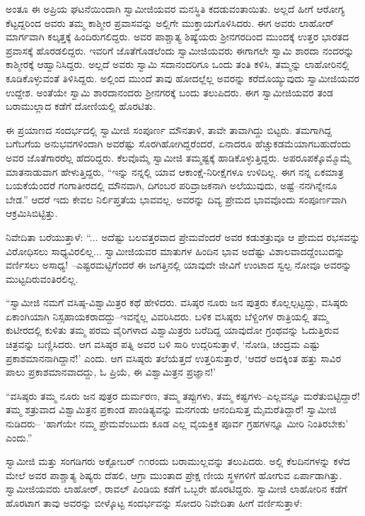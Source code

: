 ಅಂತೂ ಈ ಅಪ್ರಿಯ ಘಟನೆಯಿಂದಾಗಿ ಸ್ವಾಮೀಜಿಯವರ ಮನಸ್ಥಿತಿ ಕದಡುವಂತಾಯಿತು. ಅಲ್ಲದೆ ಹೀಗೆ ಆರೋಗ್ಯ ಕೆಟ್ಟದ್ದರಿಂದ ಅವರು ತಮ್ಮ ಕಾಶ್ಮೀರ ಪ್ರವಾಸವನ್ನು ಅಲ್ಲಿಗೇ ಮುಕ್ತಾಯಗೊಳಿಸಿದರು. ಈಗ ಅವರು ಲಾಹೋರ್ ಮಾರ್ಗವಾಗಿ ಕಲ್ಕತ್ತಕ್ಕೆ ಹಿಂದಿರುಗಲಿದ್ದರು. ಅವರ ಪಾಶ್ಚಾತ್ಯ ಶಿಷ್ಯೆಯರು ಶ್ರೀನಗರದಿಂದ ಮುಂದಕ್ಕೆ ಉತ್ತರ ಭಾರತದ ಪ್ರವಾಸಕ್ಕೆ ಹೊರಡಲಿದ್ದರು. ಇವರಿಗೆ ಜೊತೆಗೊಡಲೆಂದು ಸ್ವಾಮೀಜಿಯವರು ಈಗಾಗಲೇ ಸ್ವಾಮಿ ಶಾರದಾ ನಂದರನ್ನು ಕಾಶ್ಮೀರಕ್ಕೆ ಆಹ್ವಾನಿಸಿದ್ದರು. ಅಲ್ಲದೆ ಅವರು ಸ್ವಾಮಿ ಸದಾನಂದರಿಗೂ ಒಂದು ತಂತಿ ಕಳಿಸಿ, ತಮ್ಮನ್ನು ಲಾಹೋರಿನಲ್ಲಿ ಕೂಡಿಕೊಳ್ಳುವಂತೆ ತಿಳಿಸಿದ್ದರು. ಅಲ್ಲಿಂದ ಮುಂದೆ ತಾವು ಹೋದಲ್ಲೆಲ್ಲ ಅವರನ್ನು ಕರೆದೊಯ್ಯುವುದು ಸ್ವಾಮೀಜಿಯವರ ಉದ್ದೇಶ. ಅಂತೆಯೇ ಸ್ವಾಮಿ ಶಾರದಾನಂದರು ಶ್ರೀನಗರಕ್ಕೆ ಬಂದು ತಲುಪಿದರು. ಈಗ ಸ್ವಾಮೀಜಿಯವರ ತಂಡ ಬರಾಮುಲ್ಲಾದ ಕಡೆಗೆ ದೋಣಿಯಲ್ಲಿ ಹೊರಟಿತು.

ಈ ಪ್ರಯಾಣದ ಸಂದರ್ಭದಲ್ಲಿ ಸ್ವಾಮೀಜಿ ಸಂಪೂರ್ಣ ಮೌನತಾಳಿ, ತಾವೇ ತಾವಾಗಿದ್ದು ಬಿಟ್ಟರು. ತಮಗಾಗಿದ್ದ ಬಗೆಬಗೆಯ ಅನುಭವಗಳಿಂದಾಗಿ ಅವರೆಷ್ಟು ಸೊರಗಿಹೋಗಿದ್ದರೆಂದರೆ, ಏನಾದರೂ ಹೆಚ್ಚುಕಡಮೆಯಾಗಬಹುದೆಂದು ಅವರ ಜೊತೆಗಾರರೆಲ್ಲ ಹೆದರಿದ್ದರು. ಕೆಲವೊಮ್ಮೆ ಸ್ವಾಮೀಜಿ ತಮ್ಮಷ್ಟಕ್ಕೆ ಹಾಡಿಕೊಳ್ಳುತ್ತಿದ್ದರು. ಅಪರೂಪಕ್ಕೊಮ್ಮೊಮ್ಮೆ ಮಾತನಾಡುವಾಗ ಹೇಳುತ್ತಿದ್ದರು, “ಇನ್ನು ನನ್ನಲ್ಲಿ ಯಾವ ಆಕಾಂಕ್ಷೆ-ನಿರೀಕ್ಷೆಗಳೂ ಉಳಿದಿಲ್ಲ. ಈಗ ನನ್ನ ಏಕಮಾತ್ರ ಬಯಕೆಯೆಂದರೆ ಗಂಗಾತೀರದಲ್ಲಿ ಮೌನವಾಗಿ, ದಿಗಂಬರ ಪರಿವ್ರಾಜಕನಾಗಿ ಅಲೆಯುವುದು, ಅಷ್ಟೆ–ನನಗಿನ್ನೇನೂ ಬೇಡ.” ಆದರೆ ಇದು ಕೇವಲ ನಿರ್ಲಿಪ್ತತೆಯ ಭಾವವಲ್ಲ. ಅವರನ್ನು ದಿವ್ಯ ಪ್ರೇಮದ ಭಾವವೊಂದು ಸಂಪೂರ್ಣವಾಗಿ ಆಕ್ರಮಿಸಿಬಿಟ್ಟಿತ್ತು.

ನಿವೇದಿತಾ ಬರೆಯುತ್ತಾಳೆ: “... ಅದೆಷ್ಟು ಬಲವತ್ತರವಾದ ಪ್ರೇಮವೆಂದರೆ ಅವರ ಕಡುಶತ್ರುವೂ ಆ ಪ್ರೇಮದ ರಭಸವನ್ನು ವಿರೋಧಿಸಲು ಸಾಧ್ಯವಿರಲಿಲ್ಲ... ಸ್ವಾಮೀಜಿಯವರ ಮಾತುಗಳ ಹಿಂದಿನ ಭಾವ ಅದೆಷ್ಟು ವಿಶಾಲವಾದದ್ದೆಂಬುದನ್ನು ವರ್ಣಿಸಲು ಅಸಾಧ್ಯ! –ಎಷ್ಟರಮಟ್ಟಿಗೆಂದರೆ ಈ ಜಗತ್ತಿನಲ್ಲಿ ಯಾವುದೇ ಜೀವಿಗೆ ಉಂಟಾದ ಸ್ವಲ್ಪ ನೋವೂ ಅವರನ್ನು ಮುಟ್ಟದಿರುವಂತಿರಲಿಲ್ಲ.

“ಸ್ವಾಮೀಜಿ ನಮಗೆ ವಸಿಷ್ಠ-ವಿಶ್ವಾಮಿತ್ರರ ಕಥೆ ಹೇಳಿದರು. ವಸಿಷ್ಠರ ನೂರು ಜನ ಪುತ್ರರು ಕೊಲ್ಲಲ್ಪಟ್ಟದ್ದು, ವಸಿಷ್ಠರು ಏಕಾಂಗಿಯಾಗಿ ನಿಸ್ಸಹಾಯಕರಾದದ್ದು–ಇವನ್ನೆಲ್ಲ ವಿವರಿಸಿದರು. ಬಳಿಕ ವಸಿಷ್ಠರು ಬೆಳ್ದಿಂಗಳ ರಾತ್ರಿಯಲ್ಲಿ ತಮ್ಮ ಕುಟೀರದಲ್ಲಿ ಕುಳಿತು ತಮ್ಮ ಪರಮ ವೈರಿಗಳಾದ ವಿಶ್ವಾಮಿತ್ರರು ಬರೆದಿದ್ದ ಯಾವುದೋ ಗ್ರಂಥವನ್ನು ಓದುತ್ತಿರುವ ಚಿತ್ರವನ್ನು ಬಣ್ಣಿಸಿದರು. ಆಗ ವಸಿಷ್ಠರ ಪತ್ನಿ ಅವರ ಬಳಿ ಸಾರಿ ಉದ್ಗರಿಸುತ್ತಾಳೆ, ‘ನೋಡಿ, ಚಂದ್ರಮ ಎಷ್ಟು ಪ್ರಕಾಶಮಾನನಾಗಿದ್ದಾನೆ!’ ಎಂದು. ಆಗ ವಸಿಷ್ಠರು ತಲೆಯೆತ್ತದೆ ಉತ್ತರಿಸುತ್ತಾರೆ, ‘ಆದರೆ ಅದಕ್ಕಿಂತ ಹತ್ತು ಸಾವಿರ ಪಾಲು ಪ್ರಕಾಶಮಾನವಾದದ್ದು, ಓ ಪ್ರಿಯೆ, ಈ ವಿಶ್ವಾಮಿತ್ರನ ಪ್ರಜ್ಞಾನ!’

“ವಸಿಷ್ಠರು ತಮ್ಮ ನೂರು ಜನ ಪುತ್ರರ ದುರ್ಮರಣ, ತಮ್ಮ ತಪ್ಪುಗಳು, ತಮ್ಮ ಕಷ್ಟಗಳು–ಎಲ್ಲವನ್ನೂ ಮರೆತುಬಿಟ್ಟಿದ್ದಾರೆ! ತಮ್ಮ ಶತ್ರುವಾದ ವಿಶ್ವಾಮಿತ್ರನ ಪ್ರಕಾಂಡ ಪಾಂಡಿತ್ಯವನ್ನು ಮನಗಂಡು ಆನಂದಿಸುತ್ತ ಮೈಮರೆತಿದ್ದಾರೆ! ಸ್ವಾಮೀಜಿ ನುಡಿದರು– ‘ಹಾಗೆಯೇ ನಮ್ಮ ಪ್ರೇಮವೆಂಬುದು ಕೂಡ ಎಲ್ಲ ವೈಯಕ್ತಿಕ ಪೂರ್ವ ಗ್ರಹಗಳನ್ನೂ ಮೀರಿ ನಿಂತಿರಬೇಕು’ ಎಂದು.”

ಸ್ವಾಮೀಜಿ ಮತ್ತು ಸಂಗಡಿಗರು ಅಕ್ಟೋಬರ್ ೧೧ರಂದು ಬರಾಮುಲ್ಲವನ್ನು ತಲುಪಿದರು. ಅಲ್ಲಿ ಕೆಲದಿನಗಳನ್ನು ಕಳೆದ ಮೇಲೆ ಅವರ ಪಾಶ್ಚಾತ್ಯ ಶಿಷ್ಯರು ದೆಹಲಿ, ಆಗ್ರಾ ಮುಂತಾದ ಪ್ರೇಕ್ಷ ಣೀಯ ಸ್ಥಳಗಳಿಗೆ ಹೋಗುವ ಏರ್ಪಾಡಾಗಿತ್ತು. ಸ್ವಾಮೀಜಿಯವರು ಲಾಹೋರ್, ರಾವಲ್ ಪಿಂಡಿಯ ಕಡೆಗೆ ಒಬ್ಬರೇ ಹೊರಟಿದ್ದರು. ಸ್ವಾಮೀಜಿ ಲಾಹೋರಿನ ಕಡೆಗೆ ಹೊರಟಾಗ ತಾವು ಅವರನ್ನು ಬೀಳ್ಕೊಟ್ಟ ಸಂದರ್ಭವನ್ನು ಸೋದರಿ ನಿವೇದಿತಾ ಹೀಗೆ ವರ್ಣಿಸುತ್ತಾಳೆ:

